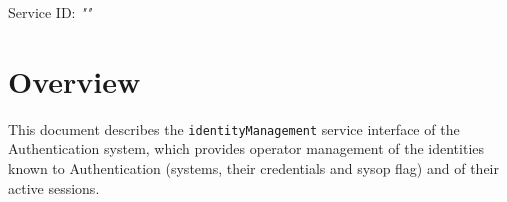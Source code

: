 \documentclass[a4paper]{arrowhead}
\begin{document}
\sloppy

\ArrowheadSetup

\begin{center}
  \vspace*{1cm}
  \huge{\arrowtitle}

  \vspace*{0.2cm}
  \LARGE{\arrowtype}
  \vspace*{1cm}

  \Large{Service ID: \textit{"\arrowid"}}

  \vspace*{\fill}


  \vspace*{1cm}
  \vspace*{\fill}

  \begin{abstract}
    This document describes the HTTP/1.1 protocol with TLS payload security and JSON payload encoding variant of the \texttt{identityManagement} service of the Authentication system.
  \end{abstract}

  \vspace*{1cm}
\end{center}

\newpage

\tableofcontents
\newpage

\section{Overview}
\label{sec:overview}

This document describes the \texttt{identityManagement} service interface of the Authentication system, which provides operator management of the identities known to Authentication (systems, their credentials and sysop flag) and of their active sessions.
\end{document}
